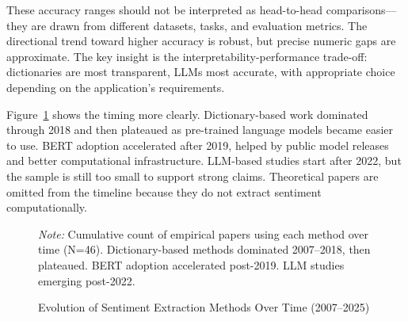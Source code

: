 \documentclass[12pt,oneside]{article}
\begin{document}
These accuracy ranges should not be interpreted as head-to-head comparisons---they are drawn from different datasets, tasks, and evaluation metrics. The directional trend toward higher accuracy is robust, but precise numeric gaps are approximate. The key insight is the interpretability-performance trade-off: dictionaries are most transparent, LLMs most accurate, with appropriate choice depending on the application's requirements.

Figure~\ref{fig:timeline} shows the timing more clearly. Dictionary-based work dominated through 2018 and then plateaued as pre-trained language models became easier to use. BERT adoption accelerated after 2019, helped by public model releases and better computational infrastructure. LLM-based studies start after 2022, but the sample is still too small to support strong claims. Theoretical papers are omitted from the timeline because they do not extract sentiment computationally.

\begin{figure}[htbp]
\centering
\caption{Evolution of Sentiment Extraction Methods Over Time (2007--2025)}
\label{fig:timeline}
\raggedright\footnotesize
\textit{Note:} Cumulative count of empirical papers using each method over time (N=46). Dictionary-based methods dominated 2007--2018, then plateaued. BERT adoption accelerated post-2019. LLM studies emerging post-2022.
\end{figure}
\end{document}
